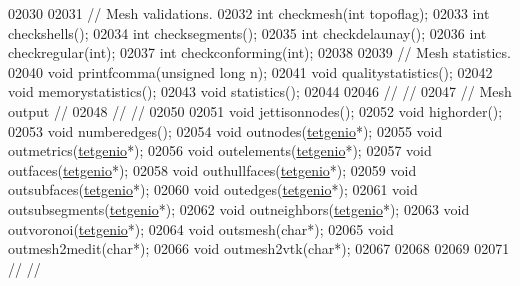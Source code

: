 \begin{DoxyCode}
02030 \textcolor{comment}{}
02031   \textcolor{comment}{// Mesh validations.}
02032   \textcolor{keywordtype}{int} checkmesh(\textcolor{keywordtype}{int} topoflag);
02033   \textcolor{keywordtype}{int} checkshells();
02034   \textcolor{keywordtype}{int} checksegments();
02035   \textcolor{keywordtype}{int} checkdelaunay();
02036   \textcolor{keywordtype}{int} checkregular(\textcolor{keywordtype}{int});
02037   \textcolor{keywordtype}{int} checkconforming(\textcolor{keywordtype}{int});
02038 
02039   \textcolor{comment}{//  Mesh statistics.}
02040   \textcolor{keywordtype}{void} printfcomma(\textcolor{keywordtype}{unsigned} \textcolor{keywordtype}{long} n);
02041   \textcolor{keywordtype}{void} qualitystatistics();
02042   \textcolor{keywordtype}{void} memorystatistics();
02043   \textcolor{keywordtype}{void} statistics();
02044 
02046 \textcolor{comment}{//                                                                           //}
02047 \textcolor{comment}{// Mesh output                                                               //}
02048 \textcolor{comment}{//                                                                           //}
02050 \textcolor{comment}{}
02051   \textcolor{keywordtype}{void} jettisonnodes();
02052   \textcolor{keywordtype}{void} highorder();
02053   \textcolor{keywordtype}{void} numberedges();
02054   \textcolor{keywordtype}{void} outnodes(\hyperlink{classtetgenio}{tetgenio}*);
02055   \textcolor{keywordtype}{void} outmetrics(\hyperlink{classtetgenio}{tetgenio}*);
02056   \textcolor{keywordtype}{void} outelements(\hyperlink{classtetgenio}{tetgenio}*);
02057   \textcolor{keywordtype}{void} outfaces(\hyperlink{classtetgenio}{tetgenio}*);
02058   \textcolor{keywordtype}{void} outhullfaces(\hyperlink{classtetgenio}{tetgenio}*);
02059   \textcolor{keywordtype}{void} outsubfaces(\hyperlink{classtetgenio}{tetgenio}*);
02060   \textcolor{keywordtype}{void} outedges(\hyperlink{classtetgenio}{tetgenio}*);
02061   \textcolor{keywordtype}{void} outsubsegments(\hyperlink{classtetgenio}{tetgenio}*);
02062   \textcolor{keywordtype}{void} outneighbors(\hyperlink{classtetgenio}{tetgenio}*);
02063   \textcolor{keywordtype}{void} outvoronoi(\hyperlink{classtetgenio}{tetgenio}*);
02064   \textcolor{keywordtype}{void} outsmesh(\textcolor{keywordtype}{char}*);
02065   \textcolor{keywordtype}{void} outmesh2medit(\textcolor{keywordtype}{char}*);
02066   \textcolor{keywordtype}{void} outmesh2vtk(\textcolor{keywordtype}{char}*);
02067 
02068 
02069 
02071 \textcolor{comment}{//                                                                           //}

\end{DoxyCode}
